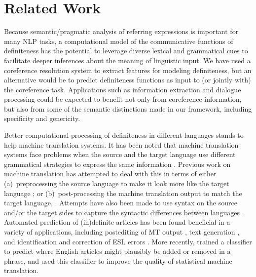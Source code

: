 \documentclass[11pt,letterpaper]{article}
\newcommand{\ensuretext}[1]{#1}
\newcommand{\nssmarker}{\ensuretext{\textcolor{magenta}{\ensuremath{^{\textsc{NS}}_{\textsc{S}}}}}}
\newcommand{\arkcomment}[3]{\ensuretext{\textcolor{#3}{[#1 #2]}}}
\newcommand{\nss}[1]{\arkcomment{\nssmarker}{#1}{magenta}}
\newcommand{\finalversion}[1]{}
\begin{document}
\finalversion{\nss{English: ±cost function, ±non-identity attributes, ±predicting intermediate labels}

\nss{maybe: which attribute groupings produce the best classifier, if we want to force a hierarchy}

\nss{feature/attribute ablations}}


\section{Related Work}\label{sec:related}

Because semantic\slash pragmatic analysis of referring expressions is important for many NLP tasks,  
a computational model of the communicative functions of definiteness has the potential to leverage 
diverse lexical and grammatical cues to facilitate deeper inferences about the meaning of linguistic input.
We have used a coreference resolution system to extract features for modeling definiteness, but 
an alternative would be to predict definiteness functions as input to (or jointly with) the coreference task. 
Applications such as information extraction and dialogue processing could be expected to benefit not only from 
coreference information, but also from some of the semantic distinctions made in our framework, including specificity and genericity.

Better computational processing of definiteness in different languages stands to help machine translation systems. 
It has been noted that machine translation systems face problems when the source and the target language 
use different grammatical strategies to express the same information \citep{stymne09,tsvetkov13}. 
Previous work on machine translation has attempted to deal with this in terms of either 
(a)~preprocessing the source language to make it look more like the target language \citep[\textit{inter alia}]{collins05,habash07,niessen00,stymne09}; 
or (b)~post-processing the machine translation output to match the target language, \cite[e.g.,][]{popovic06}. 
Attempts have also been made to use syntax on the source and\slash or the target sides 
to capture the syntactic differences between languages \citep{liu06,yamada02,zhang07}. 
Automated prediction of (in)definite articles has been found beneficial in a variety of applications, 
including postediting of MT output \citep{knight1994automated}, text generation \citep{DBLP:conf/aaai/Elhadad93,minnen2000memory}, 
and identification and correction of ESL errors \citep{aehan2006detecting,de2008classifier,gamon2008,rozovskaya2010training}. 
More recently, \citet{tsvetkov13} trained a classifier to predict where English articles might plausibly be added or removed in a phrase, 
and used this classifier to improve the quality of statistical machine translation. 
\end{document}
